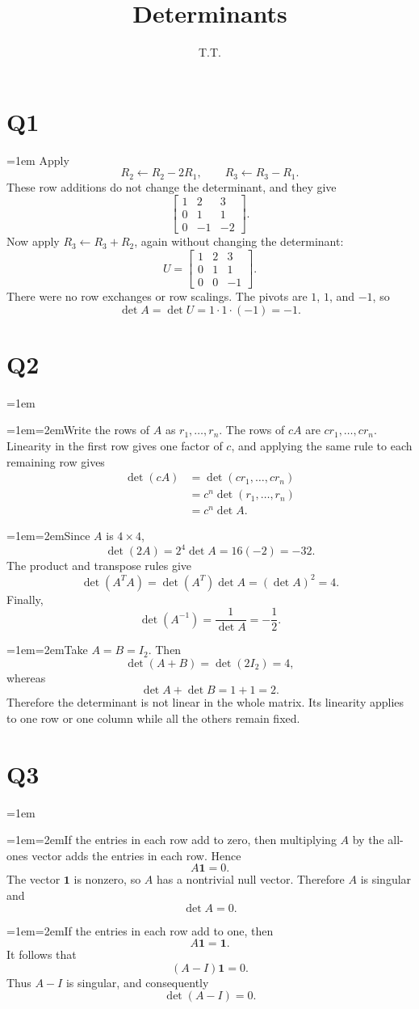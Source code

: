 \documentclass[11pt]{article}
\title{Determinants}\author{T.T.}\date{}
\newcommand{\solutionquestion}[1]{\par\leftskip=0pt\section*{Q#1}\leftskip=1em}
\newcommand{\solutionpart}[1]{\par\smallskip\leftskip=1em\noindent\hangindent=2em\hangafter=1\makebox[1.5em][l]{\textbf{(#1)}}\hspace{0.5em}\ignorespaces}
\begin{document}
\maketitle

\solutionquestion{1}
Apply
\[
R_2\leftarrow R_2-2R_1,
\qquad
R_3\leftarrow R_3-R_1.
\]
These row additions do not change the determinant, and they give
\[
\begin{bmatrix}
1&2&3\\
0&1&1\\
0&-1&-2
\end{bmatrix}.
\]
Now apply $R_3\leftarrow R_3+R_2$, again without changing the determinant:
\[
U=\begin{bmatrix}
1&2&3\\
0&1&1\\
0&0&-1
\end{bmatrix}.
\]
There were no row exchanges or row scalings. The pivots are $1$, $1$, and $-1$, so
\[
\det A=\det U=1\cdot1\cdot(-1)=-1.
\]

\solutionquestion{2}
\solutionpart{i}Write the rows of $A$ as $r_1,\ldots,r_n$. The rows of $cA$ are $cr_1,\ldots,cr_n$. Linearity in the first row gives one factor of $c$, and applying the same rule to each remaining row gives
\[
\begin{aligned}
\det(cA)
&=\det(cr_1,\ldots,cr_n)\\
&=c^n\det(r_1,\ldots,r_n)\\
&=c^n\det A.
\end{aligned}
\]

\solutionpart{ii}Since $A$ is $4\times4$,
\[
\det(2A)=2^4\det A=16(-2)=-32.
\]
The product and transpose rules give
\[
\det({A}^{T}A)=\det({A}^{T})\det A={ (\det A) }^2=4.
\]
Finally,
\[
\det(A^{-1})=\frac{1}{\det A}=-\frac12.
\]

\solutionpart{iii}Take $A=B=I_2$. Then
\[
\det(A+B)=\det(2I_2)=4,
\]
whereas
\[
\det A+\det B=1+1=2.
\]
Therefore the determinant is not linear in the whole matrix. Its linearity applies to one row or one column while all the others remain fixed.

\solutionquestion{3}
\solutionpart{i}If the entries in each row add to zero, then multiplying $A$ by the all-ones vector adds the entries in each row. Hence
\[
A\boldsymbol{1}=0.
\]
The vector $\boldsymbol{1}$ is nonzero, so $A$ has a nontrivial null vector. Therefore $A$ is singular and
\[
\det A=0.
\]

\solutionpart{ii}If the entries in each row add to one, then
\[
A\boldsymbol{1}=\boldsymbol{1}.
\]
It follows that
\[
(A-I)\boldsymbol{1}=0.
\]
Thus $A-I$ is singular, and consequently
\[
\det(A-I)=0.
\]
\end{document}
